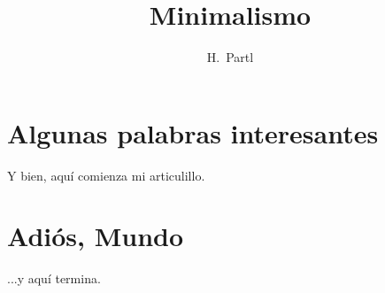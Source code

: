 \documentclass[a4paper,11pt]{article}
\author{H.~Partl}
\title{Minimalismo}
\begin{document}
\maketitle
\tableofcontents
\section{Algunas palabras interesantes}
Y bien, aquí comienza mi articulillo.
\section{Adiós, Mundo}
...y aquí termina.
\end{document}
